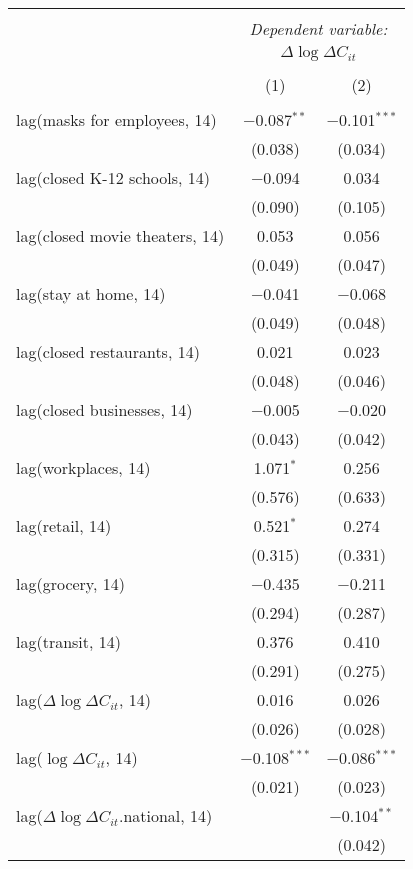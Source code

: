 \begin{tabular}{@{\extracolsep{1pt}}lcc} 
\\[-1.8ex]\hline 
\hline \\[-1.8ex] 
 & \multicolumn{2}{c}{\textit{Dependent variable:}} \\ 
\cline{2-3} 
 & \multicolumn{2}{c}{$\Delta \log \Delta C_{it}$} \\ 
\\[-1.8ex] & (1) & (2)\\ 
\hline \\[-1.8ex] 
 lag(masks for employees, 14) & $-$0.087$^{**}$ & $-$0.101$^{***}$ \\ 
  & (0.038) & (0.034) \\ 
  lag(closed K-12 schools, 14) & $-$0.094 & 0.034 \\ 
  & (0.090) & (0.105) \\ 
  lag(closed movie theaters, 14) & 0.053 & 0.056 \\ 
  & (0.049) & (0.047) \\ 
  lag(stay at home, 14) & $-$0.041 & $-$0.068 \\ 
  & (0.049) & (0.048) \\ 
  lag(closed restaurants, 14) & 0.021 & 0.023 \\ 
  & (0.048) & (0.046) \\ 
  lag(closed businesses, 14) & $-$0.005 & $-$0.020 \\ 
  & (0.043) & (0.042) \\ 
  lag(workplaces, 14) & 1.071$^{*}$ & 0.256 \\ 
  & (0.576) & (0.633) \\ 
  lag(retail, 14) & 0.521$^{*}$ & 0.274 \\ 
  & (0.315) & (0.331) \\ 
  lag(grocery, 14) & $-$0.435 & $-$0.211 \\ 
  & (0.294) & (0.287) \\ 
  lag(transit, 14) & 0.376 & 0.410 \\ 
  & (0.291) & (0.275) \\ 
  lag($\Delta \log \Delta C_{it}$, 14) & 0.016 & 0.026 \\ 
  & (0.026) & (0.028) \\ 
  lag($\log \Delta C_{it}$, 14) & $-$0.108$^{***}$ & $-$0.086$^{***}$ \\ 
  & (0.021) & (0.023) \\ 
  lag($\Delta \log \Delta C_{it}$.national, 14) &  & $-$0.104$^{**}$ \\ 
  &  & (0.042) \\ 

\end{tabular}
